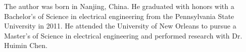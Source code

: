 The author was born in Nanjing, China. He graduated with honors with a Bachelor's of Science in electrical engineering from the Pennsylvania State University in 2011. He attended the University of New Orleans to pursue a Master's of Science in electrical engineering and performed research with Dr. Huimin Chen.
